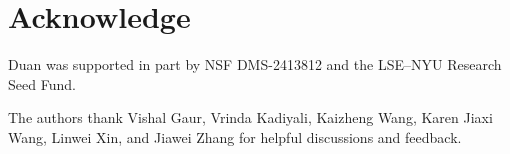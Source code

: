 

\section*{Acknowledge}



    Duan was supported in part by NSF DMS-2413812 and the LSE--NYU Research Seed Fund.
    
    The authors thank Vishal Gaur, Vrinda Kadiyali, Kaizheng Wang, Karen Jiaxi Wang, Linwei Xin, and Jiawei Zhang for helpful discussions and feedback.